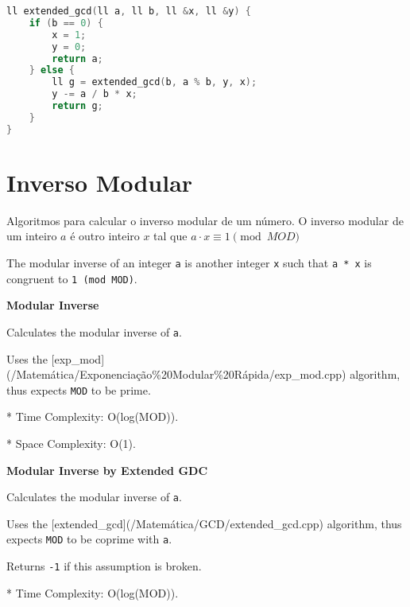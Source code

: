 \documentclass[11pt, a4paper, oneside]{book}
\begin{document}
\hfill

\begin{multicols}{2}
\begin{lstlisting}[language=C++]
ll extended_gcd(ll a, ll b, ll &x, ll &y) {
    if (b == 0) {
        x = 1;
        y = 0;
        return a;
    } else {
        ll g = extended_gcd(b, a % b, y, x);
        y -= a / b * x;
        return g;
    }
}
\end{lstlisting}
\end{multicols}

\hfill

\section{Inverso Modular}


Algoritmos para calcular o inverso modular de um número. O inverso modular de um inteiro $a$ é outro inteiro $x$ tal que $a \cdot x \equiv 1 \pmod{MOD}$



The modular inverse of an integer \lstinline{a} is another integer \lstinline{x} such that \lstinline{a * x} is congruent to \lstinline{1 (mod MOD)}.



\textbf{Modular Inverse} 



Calculates the modular inverse of \lstinline{a}.



Uses the [exp\_mod](/Matemática/Exponenciação\%20Modular\%20Rápida/exp\_mod.cpp) algorithm, thus expects \lstinline{MOD} to be prime.



* Time Complexity: O(log(MOD)).

* Space Complexity: O(1).



\textbf{Modular Inverse by Extended GDC} 



Calculates the modular inverse of \lstinline{a}.



Uses the [extended\_gcd](/Matemática/GCD/extended\_gcd.cpp) algorithm, thus expects \lstinline{MOD} to be coprime with \lstinline{a}.



Returns \lstinline{-1} if this assumption is broken.



* Time Complexity: O(log(MOD)).
\end{document}
